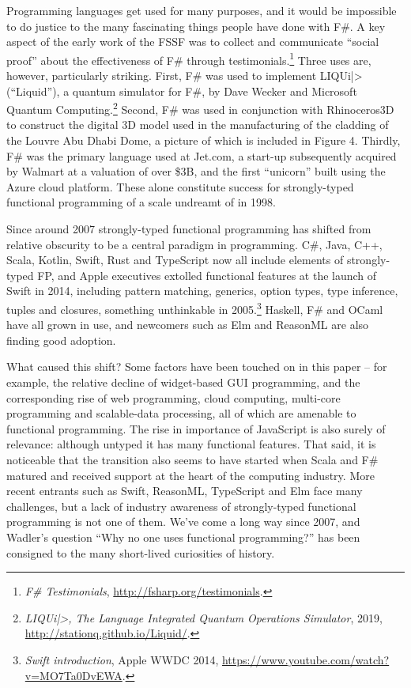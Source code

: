 \documentclass[acmsmall,review]{acmart}\settopmatter{printfolios=true,printccs=false,printacmref=false}
\begin{document}
Programming languages get used for many purposes, and it would be impossible to do justice to the many fascinating
things people have done with F\#.  A key aspect of the early work of the FSSF was to collect and communicate
“social proof” about the effectiveness of F\# through testimonials.\footnote{\textit{F\# Testimonials}, \url{http://fsharp.org/testimonials}.}
Three uses are, however, particularly striking.
First, F\# was used to implement LIQUi|> (“Liquid”), a quantum simulator for F\#, by Dave Wecker and Microsoft
Quantum Computing.\footnote{\textit{LIQUi|>, The Language Integrated Quantum Operations Simulator}, 2019, \url{http://stationq.github.io/Liquid/}.}
  Second, F\# was used in conjunction with Rhinoceros3D to construct the digital 3D model
used in the manufacturing of the cladding of the Louvre Abu Dhabi Dome, a picture of which is included in Figure 4.
Thirdly, F\# was the primary language used at Jet.com, a start-up subsequently acquired by Walmart at a valuation
of over \$3B, and the first “unicorn” built using the Azure cloud platform. These alone constitute success for
strongly-typed functional programming of a scale undreamt of in 1998.

Since around 2007 strongly-typed functional programming has shifted from relative obscurity to be a central paradigm
in programming. C\#, Java, C++, Scala, Kotlin, Swift, Rust and TypeScript now all include elements of
strongly-typed FP, and Apple executives extolled functional features at the launch of Swift in 2014, including
pattern matching, generics, option types, type inference, tuples and closures,
something unthinkable in 2005.\footnote{\textit{Swift introduction}, Apple WWDC 2014, \url{https://www.youtube.com/watch?v=MO7Ta0DvEWA}.} Haskell,
F\# and OCaml have all grown in use, and newcomers such as Elm and ReasonML are also finding good adoption.

What caused this shift? Some factors have been touched on in this paper – for example, the relative decline of
widget-based GUI programming, and the corresponding rise of web programming, cloud computing, multi-core
programming and scalable-data processing, all of which are amenable to functional programming. The rise in importance
of JavaScript is also surely of relevance: although untyped it has many functional features. That said, it is noticeable
that the transition also seems to have started when Scala and F\# matured and received support at the heart of the
computing industry. More recent entrants such as Swift, ReasonML, TypeScript and Elm face many challenges,
but a lack of industry awareness of strongly-typed functional programming is not one of them. We’ve come a long
way since 2007, and Wadler’s question “Why no one uses functional programming?” has been consigned to the many short-lived curiosities of history.
\end{document}
